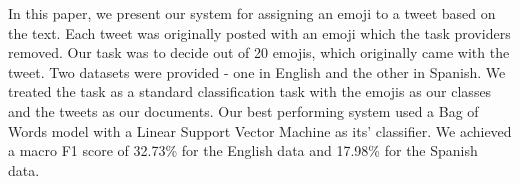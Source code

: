 In this paper, we present our system for assigning an emoji to a tweet based on the text. Each tweet was originally posted with an emoji which the task providers removed. Our task was to decide out of 20 emojis, which originally came with the tweet. Two datasets were provided - one in English and the other in Spanish. We treated the task as a standard classification task with the emojis as our classes and the tweets as our documents. Our best performing system used a Bag of Words model with a Linear Support Vector Machine as its' classifier. We achieved a macro F1 score of 32.73\% for the English data and 17.98\% for the Spanish data.
